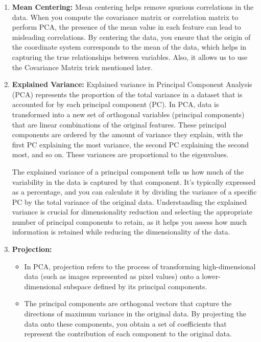 \documentclass{article}
\begin{document}
\begin{enumerate}
    \item \textbf{Mean Centering: } Mean centering helps remove spurious correlations in the data. When you compute the covariance matrix or correlation matrix to perform PCA, the presence of the mean value in each feature can lead to misleading correlations. By centering the data, you ensure that the origin of the coordinate system corresponds to the mean of the data, which helps in capturing the true relationships between variables. Also, it allows us to use the Covariance Matrix trick mentioned later.

    \item \textbf{Explained Variance: } Explained variance in Principal Component Analysis (PCA) represents the proportion of the total variance in a dataset that is accounted for by each principal component (PC). In PCA, data is transformed into a new set of orthogonal variables (principal components) that are linear combinations of the original features. These principal components are ordered by the amount of variance they explain, with the first PC explaining the most variance, the second PC explaining the second most, and so on. These variances are proportional to the eigenvalues.

The explained variance of a principal component tells us how much of the variability in the data is captured by that component. It's typically expressed as a percentage, and you can calculate it by dividing the variance of a specific PC by the total variance of the original data. Understanding the explained variance is crucial for dimensionality reduction and selecting the appropriate number of principal components to retain, as it helps you assess how much information is retained while reducing the dimensionality of the data.

\item \textbf{Projection: }
\begin{itemize}
    \item In PCA, projection refers to the process of transforming high-dimensional data (such as images represented as pixel values) onto a lower-dimensional subspace defined by its principal components.

    \item The principal components are orthogonal vectors that capture the directions of maximum variance in the original data. By projecting the data onto these components, you obtain a set of coefficients that represent the contribution of each component to the original data.


\end{itemize}
\end{enumerate}
\end{document}

